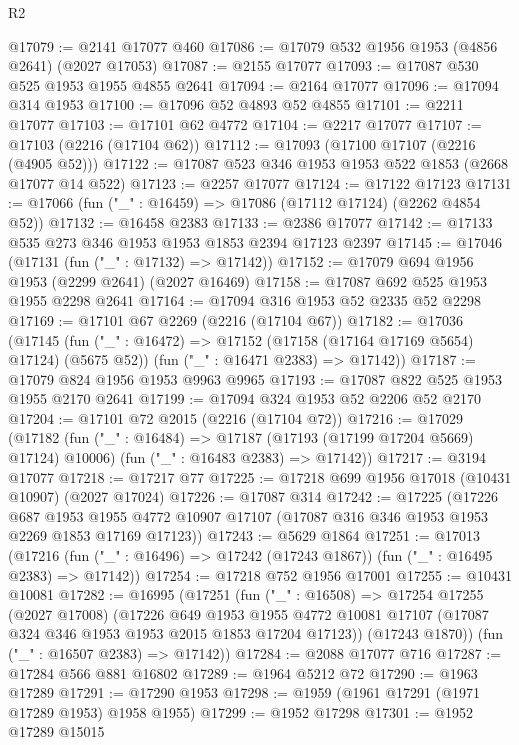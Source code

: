 \begin{lexlean}{R2}
\begin{coremodule}
@17079 := @2141 @17077 @460
@17086 := @17079 @532 @1956 @1953 (@4856 @2641) (@2027 @17053)
@17087 := @2155 @17077
@17093 := @17087 @530 @525 @1953 @1955 @4855 @2641
@17094 := @2164 @17077
@17096 := @17094 @314 @1953
@17100 := @17096 @52 @4893 @52 @4855
@17101 := @2211 @17077
@17103 := @17101 @62 @4772
@17104 := @2217 @17077
@17107 := @17103 (@2216 (@17104 @62))
@17112 := @17093 (@17100 @17107 (@2216 (@4905 @52)))
@17122 := @17087 @523 @346 @1953 @1953 @522 @1853 (@2668 @17077 @14 @522)
@17123 := @2257 @17077
@17124 := @17122 @17123
@17131 := @17066 (fun ("_" : @16459) => @17086 (@17112 @17124) (@2262 @4854 @52))
@17132 := @16458 @2383
@17133 := @2386 @17077
@17142 := @17133 @535 @273 @346 @1953 @1953 @1853 @2394 @17123 @2397
@17145 := @17046 (@17131 (fun ("_" : @17132) => @17142))
@17152 := @17079 @694 @1956 @1953 (@2299 @2641) (@2027 @16469)
@17158 := @17087 @692 @525 @1953 @1955 @2298 @2641
@17164 := @17094 @316 @1953 @52 @2335 @52 @2298
@17169 := @17101 @67 @2269 (@2216 (@17104 @67))
@17182 := @17036
    (@17145
      (fun ("_" : @16472) => @17152 (@17158 (@17164 @17169 @5654) @17124) (@5675 @52))
      (fun ("_" : @16471 @2383) => @17142))
@17187 := @17079 @824 @1956 @1953 @9963 @9965
@17193 := @17087 @822 @525 @1953 @1955 @2170 @2641
@17199 := @17094 @324 @1953 @52 @2206 @52 @2170
@17204 := @17101 @72 @2015 (@2216 (@17104 @72))
@17216 := @17029
    (@17182
      (fun ("_" : @16484) => @17187 (@17193 (@17199 @17204 @5669) @17124) @10006)
      (fun ("_" : @16483 @2383) => @17142))
@17217 := @3194 @17077
@17218 := @17217 @77
@17225 := @17218 @699 @1956 @17018 (@10431 @10907) (@2027 @17024)
@17226 := @17087 @314
@17242 := @17225
    (@17226
      @687
      @1953
      @1955
      @4772
      @10907
      @17107
      (@17087 @316 @346 @1953 @1953 @2269 @1853 @17169 @17123))
@17243 := @5629 @1864
@17251 := @17013
    (@17216 (fun ("_" : @16496) => @17242 (@17243 @1867)) (fun ("_" : @16495 @2383) => @17142))
@17254 := @17218 @752 @1956 @17001
@17255 := @10431 @10081
@17282 := @16995
    (@17251
      (fun ("_" : @16508) =>
      @17254
        @17255
        (@2027 @17008)
        (@17226
          @649
          @1953
          @1955
          @4772
          @10081
          @17107
          (@17087 @324 @346 @1953 @1953 @2015 @1853 @17204 @17123))
        (@17243 @1870))
      (fun ("_" : @16507 @2383) => @17142))
@17284 := @2088 @17077 @716
@17287 := @17284 @566 @881 @16802
@17289 := @1964 @5212 @72
@17290 := @1963 @17289
@17291 := @17290 @1953
@17298 := @1959 (@1961 @17291 (@1971 @17289 @1953) @1958 @1955)
@17299 := @1952 @17298
@17301 := @1952 @17289 @15015

\end{coremodule}
\end{lexlean}
